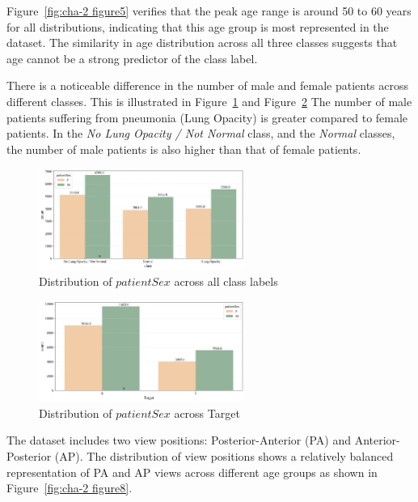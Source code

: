 Figure~\ref{fig:cha-2 figure5} verifies that the peak age range is around 50 to 60 years for all distributions, indicating that this age group is most represented in the dataset. The similarity in age distribution across all three classes suggests that age cannot be a strong predictor of the class label.

There is a noticeable difference in the number of male and female patients across different classes. This is illustrated in Figure~\ref{fig:cha-2 figure6} and Figure~\ref{fig:cha-2 figure7} The number of male patients suffering from pneumonia (Lung Opacity) is greater compared to female patients. In the \emph{No Lung Opacity / Not Normal} class, and the \emph{Normal} classes,  the number of male patients is also higher than that of female patients.

\begin{figure}[H]
    \begin{center}
        \includegraphics[width = 0.6\textwidth]{figures/Figure11.png}
        \caption{Distribution of $patientSex$ across all class labels}
        \label{fig:cha-2 figure6}
    \end{center}
\end{figure}

\begin{figure}[H]
    \begin{center}
        \includegraphics[width = 0.6\textwidth]{figures/Figure12.png}
        \caption{Distribution of $patientSex$ across Target}
        \label{fig:cha-2 figure7}
    \end{center}
\end{figure}

The dataset includes two view positions: Posterior-Anterior (PA) and Anterior-Posterior (AP). The distribution of view positions shows a relatively balanced representation of PA and AP views across different age groups as shown in Figure~\ref{fig:cha-2 figure8}.

